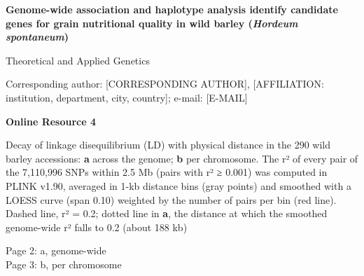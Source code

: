 \documentclass[10pt]{article}
\begin{document}
{\large\bfseries Genome-wide association and haplotype analysis identify candidate genes for grain nutritional quality in wild barley (\textit{Hordeum spontaneum})\par}\vspace{3mm}
Theoretical and Applied Genetics\par
[AUTHOR NAMES]\par
Corresponding author: [CORRESPONDING AUTHOR], [AFFILIATION: institution, department, city, country]; e-mail: [E-MAIL]\par\vspace{10mm}
{\large\bfseries Online Resource 4\par}\vspace{3mm}
Decay of linkage disequilibrium (LD) with physical distance in the 290 wild barley accessions: \textbf{a} across the genome; \textbf{b} per chromosome. The r² of every pair of the 7,110,996 SNPs within 2.5 Mb (pairs with r² ≥ 0.001) was computed in PLINK v1.90, averaged in 1-kb distance bins (gray points) and smoothed with a LOESS curve (span 0.10) weighted by the number of pairs per bin (red line). Dashed line, r² = 0.2; dotted line in \textbf{a}, the distance at which the smoothed genome-wide r² falls to 0.2 (about 188 kb)\par\vspace{6mm}
{\small Page 2: a, genome-wide\\ Page 3: b, per chromosome}
\end{document}
